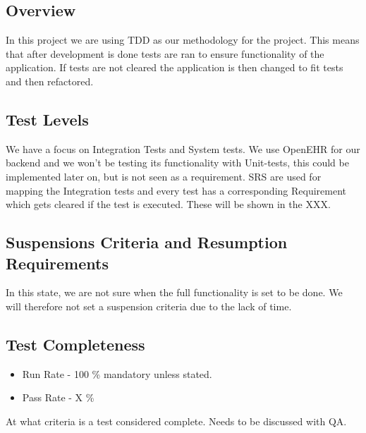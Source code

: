 \subsection{Overview}
In this project we are using TDD as our methodology for the project. This means that after development is done tests are ran to ensure functionality of the application. If tests are not cleared the application is then changed to fit tests and then refactored.  

\subsection{Test Levels}
We have a focus on Integration Tests and System tests. We use OpenEHR for our backend and we won't be testing its functionality with Unit-tests, this could be implemented later on, but is not seen as a requirement. SRS are used for mapping the Integration tests and every test has a corresponding Requirement which gets cleared if the test is executed. These will be shown in the XXX.


\subsection{Suspensions Criteria and Resumption Requirements}
In this state, we are not sure when the full functionality is set to be done. We will therefore not set a suspension criteria due to the lack of time.

\subsection{Test Completeness}
\begin{itemize}
    \item Run Rate - 100 \% mandatory unless stated.
    \item Pass Rate - X \%
\end{itemize}
At what criteria is a test considered complete. Needs to be discussed with QA. 
